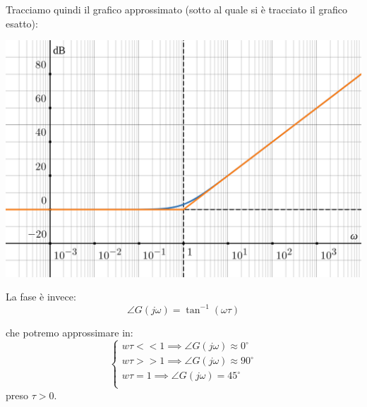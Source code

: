 \documentclass[a4paper,11pt]{article}
\begin{document}
\par\medskip

\noindent
\begin{minipage}{\textwidth}
Tracciamo quindi il grafico approssimato (sotto al quale si è tracciato il grafico esatto):
\begin{center}
	\includegraphics[scale=0.3]{../figures/rdifferentiator_bode/mod.png} 
\end{center}
\end{minipage}

\par\medskip

La fase è invece:
$$
\angle G(j \omega) = \tan^{-1} (\omega \tau)
$$

che potremo approssimare in:
\[
	\begin{cases}
		w \tau << 1 \implies \angle G(j\omega) \approx 0^\circ \\ 	
		w \tau >> 1 \implies \angle G(j\omega) \approx 90^\circ \\ 	
		w \tau = 1 \implies \angle G(j\omega) = 45^\circ \\ 	
	\end{cases}
\]
preso $\tau > 0$.

\par\medskip
\end{document}
